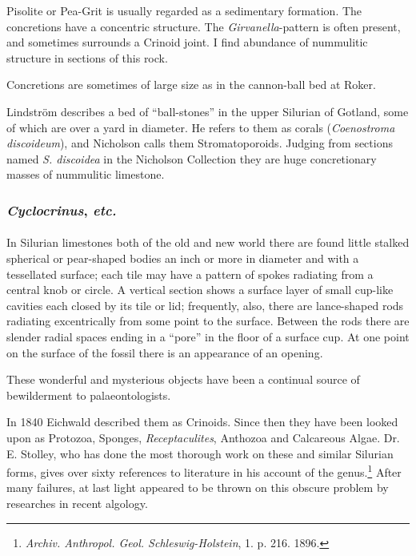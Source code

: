 \documentclass[a4paper, 12pt, oneside, landscape]{article}
\begin{document}
Pisolite or Pea-Grit is usually regarded as a sedimentary formation. The concretions have a concentric structure. The \emph{Girvanella}-pattern is often present, and sometimes surrounds a Crinoid joint. I find abundance of nummulitic structure in sections of this rock.

Concretions are sometimes of large size as in the cannon-ball bed at Roker.

Lindström describes a bed of ``ball-stones'' in the upper Silurian of Gotland, some of which are over a yard in diameter. He refers to them as corals (\emph{Coenostroma discoideum}), and Nicholson calls them Stromatoporoids. Judging from sections named \emph{S. discoidea} in the Nicholson Collection they are huge concretionary masses of nummulitic limestone.

\subsubsection{\emph{Cyclocrinus}, \emph{etc.}}
\paragraph{}
In Silurian limestones both of the old and new world there are found little stalked spherical or pear-shaped bodies an inch or more in diameter and with a tessellated surface; each tile may have a pattern of spokes radiating from a central knob or circle. A vertical section shows a surface layer of small cup-like cavities each closed by its tile or lid; frequently, also, there are lance-shaped rods radiating excentrically from some point to the surface. Between the rods there are slender radial spaces ending in a ``pore'' in the floor of a surface cup. At one point on the surface of the fossil there is an appearance of an opening.

These wonderful and mysterious objects have been a continual source of bewilderment to palaeontologists.

In 1840 Eichwald described them as Crinoids. Since then they have been looked upon as Protozoa, Sponges, \emph{Receptaculites}, Anthozoa and Calcareous Algae. Dr. E. Stolley, who has done the most thorough work on these and similar Silurian forms, gives over sixty references to literature in his account of the genus.\footnote{\emph{Archiv. Anthropol. Geol. Schleswig-Holstein}, 1. p. 216. 1896.} After many failures, at last light appeared to be thrown on this obscure problem by researches in recent algology.
\end{document}
